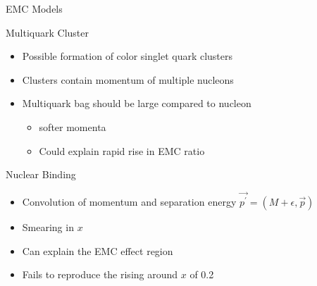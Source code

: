 \documentclass[12pt,usenames,dvipsnames]{beamer}
\begin{document}
\begin{frame}{EMC Models}
\vspace{-0.5cm}
\begin{block}{Multiquark Cluster}
	\begin{itemize}
		\item Possible formation of color singlet quark clusters
		\item Clusters contain momentum of multiple nucleons
		\item Multiquark bag should be large compared to nucleon
		\begin{itemize}
			\item softer momenta
			\item Could explain rapid rise in EMC ratio
		\end{itemize}
	\end{itemize}
\end{block}
\pause
\begin{block}{Nuclear Binding}
	\begin{itemize}
		\item Convolution of momentum and separation energy $\vec{p^{\prime}} = (M + \epsilon, \vec{p})$
		\item Smearing in $x$ 
		\item Can explain the EMC effect region 
		\item Fails to reproduce the rising around $x$ of 0.2
	\end{itemize}
\end{block}
\end{frame}
\end{document}
